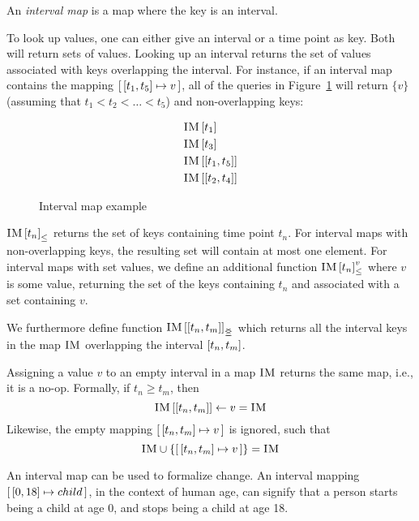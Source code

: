 \begin{definition}
An \emph{interval map} is a map where the key is an interval. 
  \label{def:interval-map}
\end{definition}

To look up values, one can either give an interval or a time point as key. Both will return sets of values. Looking up an interval returns the set of values associated with keys overlapping the interval. For instance, if an interval map  contains the mapping $\intervalmapping{t_1}{t_5}{v}$, all of the queries in Figure~\ref{ex:interval-map} will return $\{v\}$ (assuming that $t_1 < t_2 < \ldots < t_5$) and non-overlapping keys:

\begin{figure}[h]
  \begin{align*}
    & \lookup{\map{IM}}{t_1} \\
    & \lookup{\map{IM}}{t_3} \\
    & \lookup{\map{IM}}{\interval{t_1}{t_5}} \\
    & \lookup{\map{IM}}{\interval{t_2}{t_4}}
  \end{align*}
  \caption{Interval map example}
  \label{ex:interval-map}
\end{figure}

${\textsc{IM} \left[ t_n \right]}_{\leq}$ returns the set of keys containing time point $t_n$. For interval maps with non-overlapping keys, the resulting set will contain at most one element. For interval maps with set values, we define an additional function ${\textsc{IM} \left[ t_n \right]^{v}_{\leq}}$ where $v$ is some value, returning the set of the keys containing $t_n$ and associated with a set containing $v$. 

We furthermore define function $\overlapping{\map{IM}}{t_n}{t_m}$ which returns all the interval keys in the map $\textsc{IM}$ overlapping the interval $\interval{t_n}{t_m}$. 

Assigning a value $v$ to an empty interval in a map $\textsc{IM}$ returns the same map, i.e., it is a no-op. Formally, if $t_n \geq t_m$, then
\[
  \lookup{\map{IM}}{\interval{t_n}{t_m}} \assign v = \map{IM}
\]
Likewise, the empty mapping $\intervalmapping{t_n}{t_m}{v}$ is ignored, such that
\[
  \map{IM} \cup \set{\intervalmapping{t_n}{t_m}{v}} = \map{IM}
\]

An interval map can be used to formalize change. An interval mapping $\intervalmapping{0}{18}{child}$, in the context of human age, can signify that a person starts being a child at age 0, and stops being a child at age 18.

